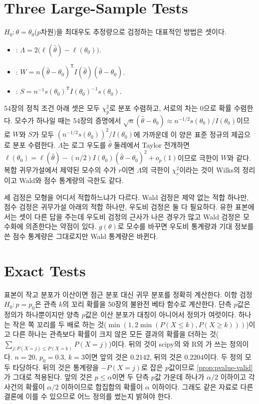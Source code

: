 \section{Three Large-Sample Tests}
\label{sec:three-tests}

$H_0:\theta=\theta_0$($p$차원)을 최대우도 추정량으로 검정하는 대표적인 방법은 셋이다.
\begin{itemize}
\item {}: $\Lambda=2\bigl(\ell(\hat\theta)-\ell(\theta_0)\bigr)$.
\item {}: $W=n(\hat\theta-\theta_0)^{\mathsf T}I(\hat\theta)(\hat\theta-\theta_0)$\cite{wald1943}.
\item {}: $S=n^{-1}s(\theta_0)^{\mathsf T}I(\theta_0)^{-1}s(\theta_0)$\cite{rao1948}.
\end{itemize}
54장의 정칙 조건 아래 셋은 모두 $\chi^2_p$로 분포 수렴하고, 서로의 차는 $0$으로 확률 수렴한다. 모수가 하나일 때는 54장의 증명에서 $\sqrt n(\hat\theta-\theta_0)\approx n^{-1/2}s(\theta_0)/I(\theta_0)$이므로 $W$와 $S$가 모두 $(n^{-1/2}s(\theta_0))^2/I(\theta_0)$에 가까운데 이 양은 표준 정규의 제곱으로 분포 수렴한다. $\Lambda$는 로그 우도를 $\hat\theta$ 둘레에서 Taylor 전개하면 $\ell(\theta_0)=\ell(\hat\theta)-(n/2)I(\theta_0)(\hat\theta-\theta_0)^2+o_p(1)$이므로 극한이 $W$와 같다. 복합 귀무가설에서 제약된 모수의 수가 $r$이면 $\Lambda$의 극한이 $\chi^2_r$이라는 것이 Wilks의 정리이고\cite{wilks1938} Wald와 점수 통계량의 극한도 같다.

세 검정은 모형을 어디서 적합하느냐가 다르다. Wald 검정은 제약 없는 적합 하나만, 점수 검정은 귀무가설 아래의 적합 하나만, 우도비 검정은 둘 다 필요하다. 유한 표본에서는 셋이 다른 답을 주는데 우도비 검정의 근사가 나은 경우가 많고 Wald 검정은 모수화에 의존한다는 약점이 있다. $g(\theta)$로 모수를 바꾸면 우도비 통계량과 기대 정보를 쓴 점수 통계량은 그대로지만 Wald 통계량은 바뀐다.

\section{Exact Tests}
\label{sec:exact-tests}

표본이 작고 분포가 이산이면 점근 분포 대신 귀무 분포를 정확히 계산한다. 이항 검정 $H_0:p=p_0$은 관측 $k$의 꼬리 확률을 50장의 불완전 베타 함수로 계산한다. 단측 $p$값은 정의가 하나뿐이지만 양측 $p$값은 이산 분포가 대칭이 아니어서 정의가 여럿이다. 하나는 작은 쪽 꼬리를 두 배로 하는 것($\min(1,2\min(P(X\le k),P(X\ge k)))$)이고 다른 하나는 관측보다 확률이 크지 않은 모든 결과의 확률을 더하는 것($\sum_{j:P(X=j)\le P(X=k)}P(X=j)$)이다. 뒤의 것이 scipy의 와 R의 가 쓰는 정의이다. $n=20$, $p_0=0.3$, $k=3$이면 앞의 것은 $0.2142$, 뒤의 것은 $0.2204$이다. 두 정의 모두 타당하다. 뒤의 것은 통계량을 $-P(X=j)$로 잡은 $p$값이므로 \cref{prop:pvalue-valid}가 그대로 적용된다. 앞의 것은 $p\le\alpha$이면 두 단측 $p$값 가운데 하나가 $\alpha/2$ 이하이고 각 사건의 확률이 $\alpha/2$ 이하이므로 합집합의 확률이 $\alpha$ 이하이다. 그래도 같은 자료로 다른 결론에 이를 수 있으므로 어느 정의를 썼는지 밝혀야 한다.

